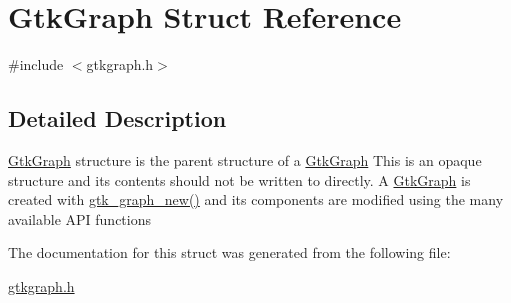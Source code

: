 \hypertarget{struct_gtk_graph}{
\section{GtkGraph Struct Reference}
\label{struct_gtk_graph}
}


{\ttfamily \#include $<$gtkgraph.h$>$}



\subsection{Detailed Description}
\hyperlink{struct_gtk_graph}{GtkGraph} structure is the parent structure of a \hyperlink{struct_gtk_graph}{GtkGraph} This is an opaque structure and its contents should not be written to directly. A \hyperlink{struct_gtk_graph}{GtkGraph} is created with \hyperlink{gtkgraph_8h_a40d33faffdf97ef054e6d12df02e0686}{gtk\_\-graph\_\-new()} and its components are modified using the many available API functions 

The documentation for this struct was generated from the following file:\begin{DoxyCompactItemize}
\item 
\hyperlink{gtkgraph_8h}{gtkgraph.h}\end{DoxyCompactItemize}
